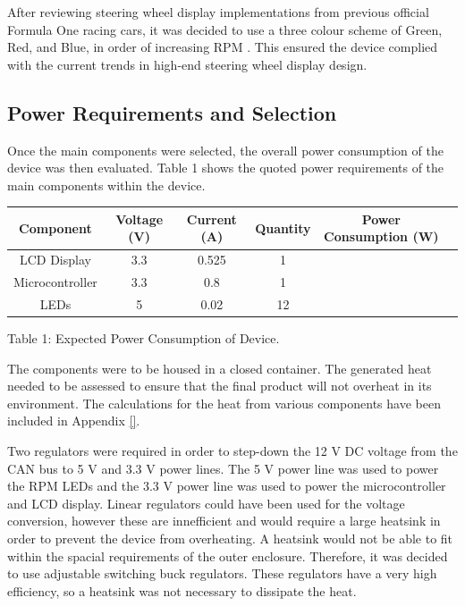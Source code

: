 \documentclass[a4paper,12pt]{article}
\begin{document}
After reviewing steering wheel display implementations from previous official Formula One racing cars, it was decided to use a three colour scheme of Green, Red, and Blue, in order of increasing RPM \cite{bsim_racing, daily_mail_1}. This ensured the device complied with the current trends in high-end steering wheel display design.

\subsection{Power Requirements and Selection}
\label{sec:PSU}

Once the main components were selected, the overall power consumption of the device was then evaluated. Table 1 shows the quoted power requirements of the main components within the device.

\begin{center}
\begin{tabular}{ | c | c | c | c | c | c | }
\hline
 Component & Voltage (V) & Current (A) & Quantity & Power Consumption (W) \\
\hline
 LCD Display & 3.3 & 0.525 & 1 & \\
\hline
 Microcontroller & 3.3 & 0.8 & 1 & \\
\hline
 LEDs & 5 & 0.02 & 12 & \\
\hline
\end{tabular}
\par
\bigskip
Table 1: Expected Power Consumption of Device.
\end{center}

The components were to be housed in a closed container. The generated heat needed to be assessed to ensure that the final product will not overheat in its environment. The calculations for the heat from various components have been included in Appendix \ref{}.
 
Two regulators were required in order to step-down the 12 V DC voltage from the CAN bus to 5 V and 3.3 V power lines. The 5 V power line was used to power the RPM LEDs and the 3.3 V power line was used to power the microcontroller and LCD display. Linear regulators could have been used for the voltage conversion, however these are innefficient and would require a large heatsink in order to prevent the device from overheating. A heatsink would not be able to fit within the spacial requirements of the outer enclosure. Therefore, it was decided to use adjustable switching buck regulators. These regulators have a very high efficiency, so a heatsink was not necessary to dissipate the heat. \\
 
\end{document}
